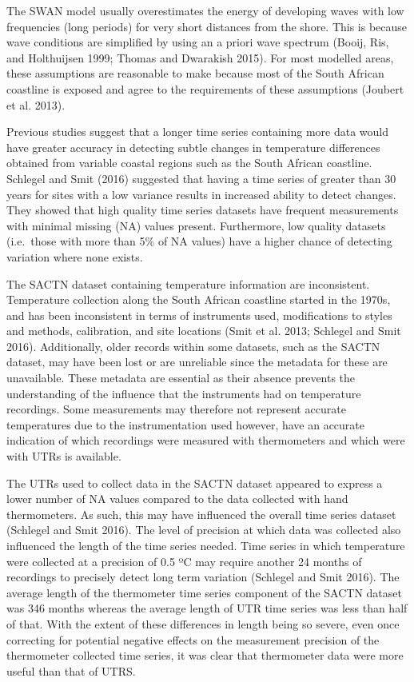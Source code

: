 \documentclass[12pt,a4paper,]{article}
\begin{document}
The SWAN model usually overestimates the energy of developing waves with
low frequencies (long periods) for very short distances from the shore.
This is because wave conditions are simplified by using an a priori wave
spectrum (Booij, Ris, and Holthuijsen 1999; Thomas and Dwarakish 2015).
For most modelled areas, these assumptions are reasonable to make
because most of the South African coastline is exposed and agree to the
requirements of these assumptions (Joubert et al. 2013).

Previous studies suggest that a longer time series containing more data
would have greater accuracy in detecting subtle changes in temperature
differences obtained from variable coastal regions such as the South
African coastline. Schlegel and Smit (2016) suggested that having a time
series of greater than 30 years for sites with a low variance results in
increased ability to detect changes. They showed that high quality time
series datasets have frequent measurements with minimal missing (NA)
values present. Furthermore, low quality datasets (i.e.~those with more
than 5\% of NA values) have a higher chance of detecting variation where
none exists.

The SACTN dataset containing temperature information are inconsistent.
Temperature collection along the South African coastline started in the
1970s, and has been inconsistent in terms of instruments used,
modifications to styles and methods, calibration, and site locations
(Smit et al. 2013; Schlegel and Smit 2016). Additionally, older records
within some datasets, such as the SACTN dataset, may have been lost or
are unreliable since the metadata for these are unavailable. These
metadata are essential as their absence prevents the understanding of
the influence that the instruments had on temperature recordings. Some
measurements may therefore not represent accurate temperatures due to
the instrumentation used however, have an accurate indication of which
recordings were measured with thermometers and which were with UTRs is
available.

The UTRs used to collect data in the SACTN dataset appeared to express a
lower number of NA values compared to the data collected with hand
thermometers. As such, this may have influenced the overall time series
dataset (Schlegel and Smit 2016). The level of precision at which data
was collected also influenced the length of the time series needed. Time
series in which temperature were collected at a precision of 0.5 ºC may
require another 24 months of recordings to precisely detect long term
variation (Schlegel and Smit 2016). The average length of the
thermometer time series component of the SACTN dataset was 346 months
whereas the average length of UTR time series was less than half of
that. With the extent of these differences in length being so severe,
even once correcting for potential negative effects on the measurement
precision of the thermometer collected time series, it was clear that
thermometer data were more useful than that of UTRS.
\end{document}

